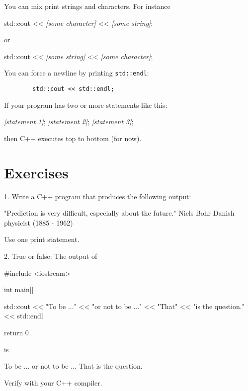 You can mix print strings and characters. For instance
\begin{console}[frame=none, commandchars=\\\{\}]

        std::cout << \textit{[some character]}
	          << \textit{[some string]};

\end{console}
or
\begin{console}[frame=none, commandchars=\\\{\}]

        std::cout << \textit{[some string]}
	          << \textit{[some character]};

\end{console}
You can force a newline by printing \verb!std::endl!:
\begin{verbatim}
        std::cout << std::endl;
\end{verbatim}



If your program has two or more statements like this:
\begin{console}[frame=none, commandchars=\\\{\}]

        \textit{[statement 1]};
        \textit{[statement 2]};
        \textit{[statement 3]};

\end{console}
then C++ executes top to bottom (for now).





\newpage\section{Exercises}


1. Write a C++ program that produces the following output:
\begin{console}
"Prediction is very difficult, 
especially about the future."
    Niels Bohr
    Danish physicist (1885 - 1962)
\end{console}
Use one print statement.

2. True or false: The output of 
\begin{console}
#include <iostream>

int main[]
{
    std::cout << "To be ..."
              << "or not to be ..."
              << "That" << "is the question." 
              << std::endl

    return 0
}
\end{console}
is
\begin{console}
To be ...  
or not to be ... 
That is the question.
\end{console}
Verify with your C++ compiler.


